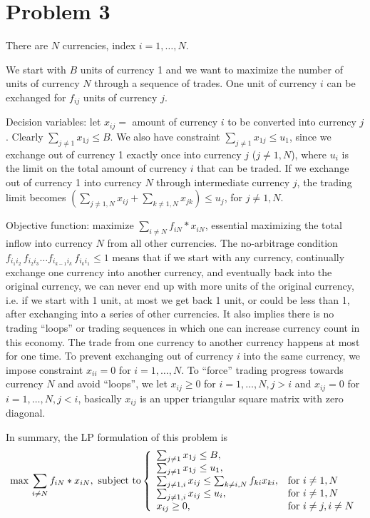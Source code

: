 \documentclass{article}
\begin{document}
\section{Problem 3}
\newcommand{\ccy}[1]{currency#1}

There are $N$ currencies, index $i=1,\dots,N$.

We start with $B$ units of currency 1 and we want to maximize the number
of units of currency $N$ through a sequence of trades. One unit of 
currency $i$ can be exchanged for $f_{ij}$ units of currency $j$.

Decision variables: let $x_{ij} =$ amount of currency $i$ to be converted 
into currency $j$. Clearly $\sum_{j\not= 1}x_{1j}\leq B$. We also have 
constraint $\sum_{j\not= 1}x_{1j}\leq u_1$, since we exchange out of 
currency 1 exactly once into currency $j$ ($j \not= 1,N$), 
where $u_i$ is the limit on the total amount of currency $i$ that can be
traded. If we exchange out of currency 1 into currency $N$ through 
intermediate currency $j$, the trading limit becomes
$(\sum_{j \not= 1,N}x_{ij} + \sum_{k \not= 1,N}x_{jk}) \leq u_j$, for $j \not= 1,N$.

Objective function: maximize $\sum_{i \not= N} f_{iN} * x_{iN}$, essential
maximizing the total inflow into currency $N$ from all other currencies. 
The no-arbitrage condition 
$f_{i_1 i_2}\,f_{i_2 i_3}\dots f_{i_{k-1} i_k}\,f_{i_k i_1}\leq 1 $ means
that if we start with any currency, continually exchange one currency into another
currency, and eventually back into the original currency, we can never end up
with more units of the original currency, i.e. if we start with 1 unit, at
most we get back 1 unit, or could be less than 1, after exchanging into a series of
other currencies. It also implies there is no trading ``loops'' or trading 
sequences in which one can increase currency count in this economy. 
The trade from one currency to another currency happens at most for one time.
To prevent exchanging out of currency $i$ into the same currency, 
we impose constraint $x_{ii}=0$ for $i=1,\dots,N$. To
``force'' trading progress towards currency $N$ and avoid ``loops'', we let 
$x_{ij}\geq 0$ for $i=1,\dots,N, j>i$ and $x_{ij}=0$ for $i=1,\dots,N, j<i$,
basically $x_{ij}$ is an upper triangular square matrix with zero diagonal.

In summary, the LP formulation of this problem is
\begin{equation}  
\max \,\sum_{i \not= N} f_{iN} * x_{iN}, \text{ subject to}
\left\{  
             \begin{array}{ll}
             \sum_{j\not= 1}x_{1j}\leq B,\\
             \sum_{j\not= 1}x_{1j}\leq u_1,\\
             \sum_{j\not= 1, i}x_{ij}\leq \sum_{k\not=i,N}f_{ki} x_{ki},& \textnormal{for~} i\not= 1,N\\
             \sum_{j\not= 1, i}x_{ij}\leq u_i,& \textnormal{for~} i\not= 1,N\\
             x_{ij}\geq 0, & \textnormal{for~} i\not= j,i\not=N
             \end{array}  
\right.  
\end{equation}  
\end{document}
